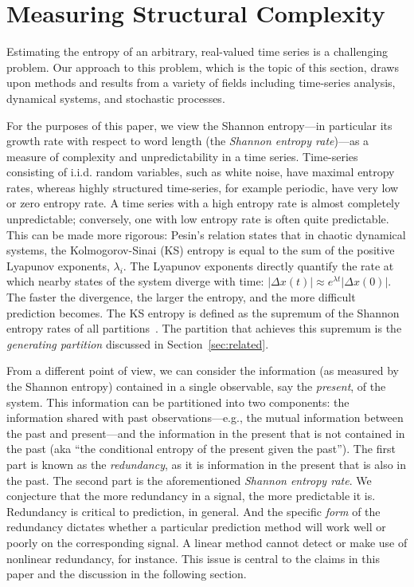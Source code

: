 \section{Measuring Structural Complexity }\label{sec:meaComplex}


Estimating the entropy of an arbitrary, real-valued time series is a
challenging problem.  Our approach to this problem, which is the topic
of this section, draws upon methods and results from a variety of
fields including time-series analysis, dynamical systems, and
stochastic processes.

For the purposes of this paper, we view the Shannon entropy---in
particular its growth rate with respect to word length (the
\emph{Shannon entropy rate})---as a measure of complexity and
unpredictability in a time series.  Time-series consisting of i.i.d.
random variables, such as white noise, have maximal entropy rates, 
whereas highly structured time-series, for example periodic, have very
low or zero entropy rate. A time series with a high entropy rate is 
almost completely unpredictable; conversely, one with low entropy rate
is often quite predictable. This can be made more rigorous: Pesin's
relation \cite{pesin77} states that in chaotic dynamical systems, the
Kolmogorov-Sinai (KS) entropy is equal to the sum of the positive
Lyapunov exponents, $\lambda_i$.  The Lyapunov exponents directly
quantify the rate at which nearby states of the system diverge with
time: $\left| \Delta x(t) \right| \approx e^{\lambda t} \left| \Delta
x(0) \right|$.  The faster the divergence, the larger the entropy, and
the more difficult prediction becomes.  The KS entropy is defined as
the supremum of the Shannon entropy rates of all
partitions~\cite{petersen1989}. The partition that achieves this
supremum is the \emph{generating partition} discussed in
Section~\ref{sec:related}.

From a different point of view, we can consider the information (as
measured by the Shannon entropy) contained in a single observable, say
the \emph{present}, of the system. This information can be partitioned
into two components: the information shared with past
observations---e.g., the mutual information between the past and
present---and the information in the present that is not contained in
the past (aka ``the conditional entropy of the present given the
past'').  The first part is known as the \emph{redundancy}, as it is
information in the present that is also in the past.  The second part
is the aforementioned \emph{Shannon entropy rate}.  We conjecture that 
the more redundancy in a signal, the more predictable it is.  
Redundancy is critical to prediction, in general.  And the specific 
\emph{form} of the redundancy dictates whether a particular prediction 
method will work well or poorly on the corresponding signal.  A linear 
method cannot detect or make use of nonlinear redundancy, for 
instance.  This issue is central to the claims in this paper and the 
discussion in the following section.


